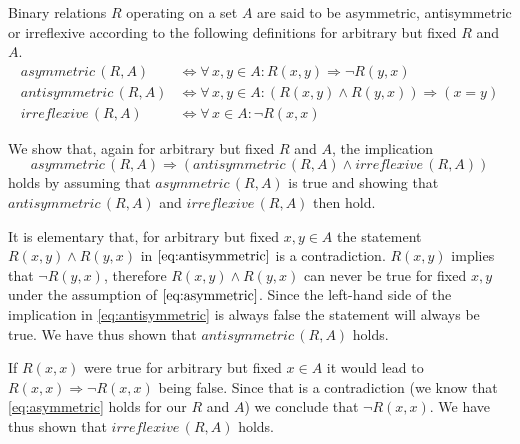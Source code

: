 \documentclass{article}
\newcommand{\asymmetric}{\textit{asymmetric}\,}
\newcommand{\antisymmetric}{\textit{antisymmetric}\,}
\newcommand{\irreflexive}{\textit{irreflexive}\,}
\begin{document}
Binary relations $R$ operating on a set $A$ are said to be asymmetric, antisymmetric or irreflexive according to the following definitions for arbitrary but fixed $R$ and $A$.
\begin{align}
    \label{eq:asymmetric} \asymmetric(R, A) &\Longleftrightarrow \forall\, x, y \in A : R(x, y) \Rightarrow \neg R(y, x) \\
    \label{eq:antisymmetric} \antisymmetric(R, A) &\Longleftrightarrow \forall\, x, y \in A : (R(x, y) \land R(y, x)) \Rightarrow (x = y) \\
    \label{eq:irreflexive} \irreflexive(R, A) &\Longleftrightarrow \forall\, x \in A : \neg R(x, x)
\end{align}

We show that, again for arbitrary but fixed $R$ and $A$, the implication
\begin{equation*}
    \asymmetric(R, A) \Rightarrow (\antisymmetric(R, A) \land \irreflexive(R, A))
\end{equation*}
holds by assuming that $\asymmetric(R, A)$ is true and showing that $\antisymmetric(R, A)$ and $\irreflexive(R, A)$ then hold.

It is elementary that, for arbitrary but fixed $x, y \in A$ the statement $R(x, y) \land R(y, x)$ in $\eqref{eq:antisymmetric}$ is a contradiction. $R(x, y)$ implies that $\neg R(y, x)$, therefore $R(x, y) \land R(y, x)$ can never be true for fixed $x, y$ under the assumption of $\eqref{eq:asymmetric}$. Since the left-hand side of the implication in \eqref{eq:antisymmetric} is always false the statement will always be true. We have thus shown that $\antisymmetric(R, A)$ holds.

If $R(x, x)$ were true for arbitrary but fixed $x \in A$ it would lead to $R(x, x) \Rightarrow \neg R(x, x)$ being false. Since that is a contradiction (we know that \eqref{eq:asymmetric} holds for our $R$ and $A$) we conclude that $\neg R(x, x)$. We have thus shown that $\irreflexive(R, A)$ holds.
\end{document}
